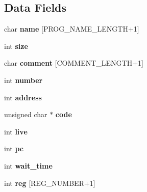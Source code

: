 \subsection*{Data Fields}
\begin{DoxyCompactItemize}
\item 
\hypertarget{structs__champion_a28dc0293f716f3fbb2d0bd1cb83f93a2}{char {\bfseries name} \mbox{[}P\-R\-O\-G\-\_\-\-N\-A\-M\-E\-\_\-\-L\-E\-N\-G\-T\-H+1\mbox{]}}\label{structs__champion_a28dc0293f716f3fbb2d0bd1cb83f93a2}

\item 
\hypertarget{structs__champion_a439227feff9d7f55384e8780cfc2eb82}{int {\bfseries size}}\label{structs__champion_a439227feff9d7f55384e8780cfc2eb82}

\item 
\hypertarget{structs__champion_ae6da1ff2fd8abd8f79b0a42acf5b98b9}{char {\bfseries comment} \mbox{[}C\-O\-M\-M\-E\-N\-T\-\_\-\-L\-E\-N\-G\-T\-H+1\mbox{]}}\label{structs__champion_ae6da1ff2fd8abd8f79b0a42acf5b98b9}

\item 
\hypertarget{structs__champion_a7106e2abc437ad981830d14176d15f09}{int {\bfseries number}}\label{structs__champion_a7106e2abc437ad981830d14176d15f09}

\item 
\hypertarget{structs__champion_a45c6bc6d1135dc398bf8deae861a2ebc}{int {\bfseries address}}\label{structs__champion_a45c6bc6d1135dc398bf8deae861a2ebc}

\item 
\hypertarget{structs__champion_a10a8d8076a169aad66a5134a4b372c91}{unsigned char $\ast$ {\bfseries code}}\label{structs__champion_a10a8d8076a169aad66a5134a4b372c91}

\item 
\hypertarget{structs__champion_a2cb50263f0f7a37d88d397a1d0e66f3a}{int {\bfseries live}}\label{structs__champion_a2cb50263f0f7a37d88d397a1d0e66f3a}

\item 
\hypertarget{structs__champion_ac8c81e61335635fa4709d82412b31f06}{int {\bfseries pc}}\label{structs__champion_ac8c81e61335635fa4709d82412b31f06}

\item 
\hypertarget{structs__champion_a1853c17443a5893d3acd539b3c7a9289}{int {\bfseries wait\-\_\-time}}\label{structs__champion_a1853c17443a5893d3acd539b3c7a9289}

\item 
\hypertarget{structs__champion_a205e2cf1e11ba6a2f7110d4b650e971c}{int {\bfseries reg} \mbox{[}R\-E\-G\-\_\-\-N\-U\-M\-B\-E\-R+1\mbox{]}}\label{structs__champion_a205e2cf1e11ba6a2f7110d4b650e971c}


\end{DoxyCompactItemize}
